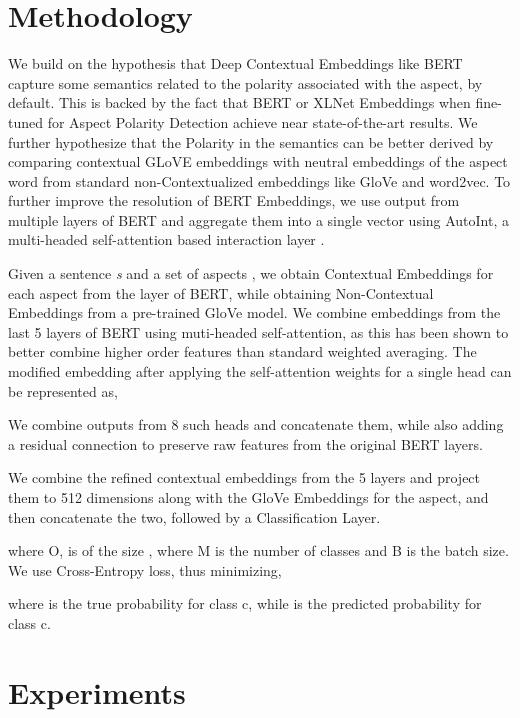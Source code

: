 \documentclass[11pt,a4paper]{article}
\begin{document}
\section{Methodology}


We build on the hypothesis that Deep Contextual Embeddings like BERT capture some semantics related to the polarity associated with the aspect, by default. This is backed by the fact that BERT or XLNet Embeddings when fine-tuned for Aspect Polarity Detection achieve near state-of-the-art results. We further hypothesize that the Polarity in the semantics can be better derived by comparing contextual GLoVE embeddings with neutral embeddings of the aspect word from standard non-Contextualized embeddings like GloVe and word2vec. To further improve the resolution of BERT Embeddings, we use output from multiple layers of BERT and aggregate them into a single vector using AutoInt, a multi-headed self-attention based interaction layer \cite{Song_2019}. 

Given a sentence \textit{s} and a set of aspects , we obtain Contextual Embeddings  for each aspect from the  layer of BERT, while obtaining Non-Contextual Embeddings  from a pre-trained GloVe model. We combine embeddings from the last 5 layers of BERT using muti-headed self-attention, as this has been shown to better combine higher order features than standard weighted averaging. The modified embedding after applying the self-attention weights for a single head can be represented as,



We combine outputs from 8 such heads and concatenate them, while also adding a residual connection to preserve raw features from the original BERT layers. 



We combine the refined contextual embeddings from the 5 layers and project them to 512 dimensions along with the GloVe Embeddings  for the aspect, and then concatenate the two, followed by a Classification Layer. 







where O, is of the size , where M is the number of classes and B is the batch size. We use Cross-Entropy loss, thus minimizing,



where  is the true probability for class c, while  is the predicted probability for class c. 

\section{Experiments}
\label{sec:length}
\end{document}
